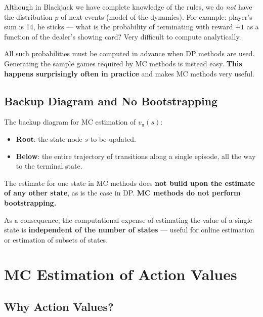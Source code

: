\documentclass[11pt,a4paper]{article}
\theoremstyle{definition}
\theoremstyle{plain}
\theoremstyle{remark}
\begin{document}
Although in Blackjack we have complete knowledge of the rules, we do \textit{not} have the distribution $p$ of next events (model of the dynamics). For example: player's sum is 14, he sticks — what is the probability of terminating with reward $+1$ as a function of the dealer's showing card? Very difficult to compute analytically.

\begin{tcolorbox}[colback=green!5!white, colframe=green!60!black]
All such probabilities must be computed in advance when DP methods are used. Generating the sample games required by MC methods is instead easy. \textbf{This happens surprisingly often in practice} and makes MC methods very useful.
\end{tcolorbox}

\subsection{Backup Diagram and No Bootstrapping}

The backup diagram for MC estimation of $v_\pi(s)$:
\begin{itemize}
    \item \textbf{Root}: the state node $s$ to be updated.
    \item \textbf{Below}: the entire trajectory of transitions along a single episode, all the way to the terminal state.
\end{itemize}

\begin{tcolorbox}[colback=orange!5!white, colframe=orange!75!black, title={\textbf{Important Observation}}]
The estimate for one state in MC methods does \textbf{not build upon the estimate of any other state}, as is the case in DP. \textbf{MC methods do not perform bootstrapping.}

As a consequence, the computational expense of estimating the value of a single state is \textbf{independent of the number of states} — useful for online estimation or estimation of subsets of states.
\end{tcolorbox}

\section{MC Estimation of Action Values}

\subsection{Why Action Values?}
\end{document}
